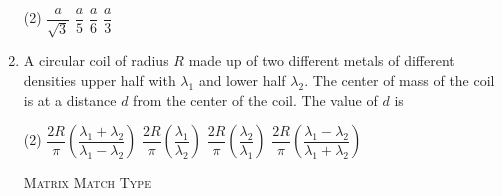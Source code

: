 \documentclass{article}
\renewcommand{\ans}{\quad}
\begin{document}
\begin{enumerate}
    \begin{tasks}(2)
        \task $\dfrac{a}{\sqrt{3}}$
        \task $\dfrac{a}{5}$\ans
        \task $\dfrac{a}{6}$
        \task $\dfrac{a}{3}$
    \end{tasks}

    \item A circular coil of radius $R$ made up of two different metals of different densities upper half with $\lambda_1$ and lower half $\lambda_2$. The center of mass of the coil is at a distance $d$ from the center of the coil. The value of $d$ is 
    \begin{tasks}(2)
        \task $\dfrac{2R}{\pi}\left(\dfrac{\lambda_1+\lambda_2}{\lambda_1-\lambda_2}\right)$
        \task $\dfrac{2R}{\pi}\left(\dfrac{\lambda_1}{\lambda_2}\right)$
        \task $\dfrac{2R}{\pi}\left(\dfrac{\lambda_2}{\lambda_1}\right)$
        \task $\dfrac{2R}{\pi}\left(\dfrac{\lambda_1-\lambda_2}{\lambda_1+\lambda_2}\right)$\ans
    \end{tasks}






    \begin{center}
        \textsc{Matrix Match Type}
    \end{center}


\end{enumerate}
\end{document}
